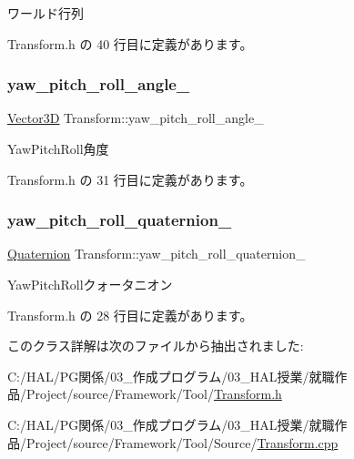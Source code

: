 ワールド行列 



 Transform.\+h の 40 行目に定義があります。

\mbox{\label{class_transform_acf33e8171e9803bebe3aba14dbedc90e}} 
\subsubsection{\texorpdfstring{yaw\+\_\+pitch\+\_\+roll\+\_\+angle\+\_\+}{yaw\_pitch\_roll\_angle\_}}
{\footnotesize\ttfamily \mbox{\hyperlink{class_vector3_d}{Vector3D}} Transform\+::yaw\+\_\+pitch\+\_\+roll\+\_\+angle\+\_\+\hspace{0.3cm}{\ttfamily [private]}}



Yaw\+Pitch\+Roll角度 



 Transform.\+h の 31 行目に定義があります。

\mbox{\label{class_transform_ac9985a4b70b9af742c9f26f47784ba7b}} 
\subsubsection{\texorpdfstring{yaw\+\_\+pitch\+\_\+roll\+\_\+quaternion\+\_\+}{yaw\_pitch\_roll\_quaternion\_}}
{\footnotesize\ttfamily \mbox{\hyperlink{_vector3_d_8h_a3ee38c9c46d9851e33a9a1113328dafc}{Quaternion}} Transform\+::yaw\+\_\+pitch\+\_\+roll\+\_\+quaternion\+\_\+\hspace{0.3cm}{\ttfamily [private]}}



Yaw\+Pitch\+Rollクォータニオン 



 Transform.\+h の 28 行目に定義があります。



このクラス詳解は次のファイルから抽出されました\+:\begin{DoxyCompactItemize}
\item 
C\+:/\+H\+A\+L/\+P\+G関係/03\+\_\+作成プログラム/03\+\_\+\+H\+A\+L授業/就職作品/\+Project/source/\+Framework/\+Tool/\mbox{\hyperlink{_transform_8h}{Transform.\+h}}\item 
C\+:/\+H\+A\+L/\+P\+G関係/03\+\_\+作成プログラム/03\+\_\+\+H\+A\+L授業/就職作品/\+Project/source/\+Framework/\+Tool/\+Source/\mbox{\hyperlink{_transform_8cpp}{Transform.\+cpp}}\end{DoxyCompactItemize}
